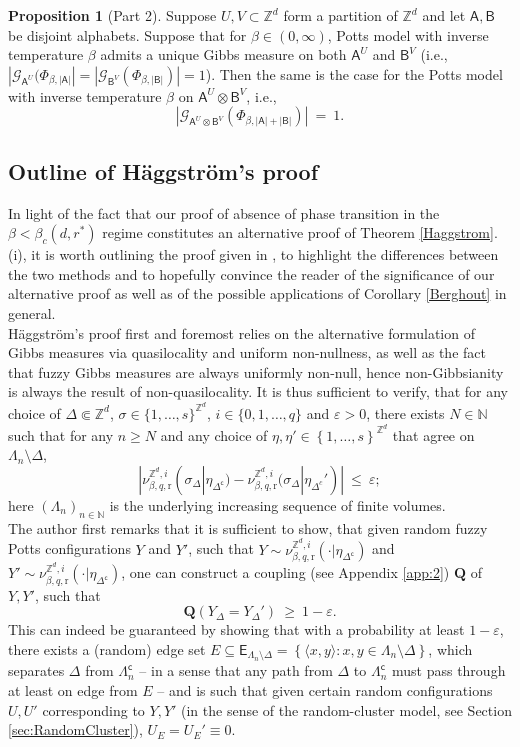 \documentclass[12pt]{article}
\renewcommand{\AA}{\mathsf{A}}
\newcommand{\AB}{\mathsf{B}}
\newcommand{\E}{\mathsf{E}}
\newcommand{\G}{\mathcal{G}}
\newcommand{\N}{\mathbb{N}}
\newcommand{\Q}{\mathbf{Q}}
\renewcommand{\r}{\mathrm{r}}
\newcommand{\Z}{\mathbb{Z}}
\newcommand{\set}[1]{\left\{#1\right\}}
\newcommand{\pika}{\boldsymbol{\cdot}}
\newcommand{\1}{\mathbbm{1}}
\renewcommand{\sp}[1]{\langle #1\rangle}
\renewcommand{\c}{\mathsf{c}}
\newcommand{\5}{\vspace{0.5cm}}
\theoremstyle{definition}
\newtheorem{prop}[thm]{Proposition}
\begin{document}
\begin{prop}[Part 2]\label{FP:part2}
Suppose $U,V\subset\Z^d$ form a partition of $\Z^d$ and let $\AA,\AB$ be disjoint alphabets. Suppose that for $\beta\in(0,\infty)$, Potts model with inverse temperature $\beta$ admits a unique Gibbs measure on both $\AA^U$ and $\AB^V$ (i.e., $|\G_{\AA^U}(\Phi_{\beta,|\AA|}|=|\G_{\AB^V}(\Phi_{\beta,|\AB|})|=1$). Then the same is the case for the Potts model with inverse temperature $\beta$ on $\AA^U\otimes\AB^V$, i.e.,
$$|\G_{\AA^U\otimes\AB^V}(\Phi_{\beta,|\AA|+|\AB|})| ~=~ 1.$$
\end{prop}

\subsection{Outline of H\"aggstr\"om's proof}\label{ProofComparison}

In light of the fact that our proof of absence of phase transition in the $\beta<\beta_c(d,r^*)$ regime constitutes an alternative proof of Theorem \ref{Haggstrom}.(i), it is worth outlining the proof given in \cite{Hag}, to highlight the differences between the two methods and to hopefully convince the reader of the significance of our alternative proof as well as of the possible applications of Corollary \ref{Berghout} in general. \\

H\"aggstr\"om's proof first and foremost relies on the alternative formulation of Gibbs measures via quasilocality and uniform non-nullness, as well as the fact that fuzzy Gibbs measures are always uniformly non-null, hence non-Gibbsianity is always the result of non-quasilocality. It is thus sufficient to verify, that for any choice of $\Delta\Subset\Z^d$, $\sigma\in\{1,\ldots,s\}^{\Z^d}$, $i\in\{0,1,\ldots,q\}$ and $\varepsilon>0$, there exists $N\in\N$ such that for any $n\geq N$ and any choice of $\eta,\eta'\in\set{1,\ldots,s}^{\Z^d}$ that agree on $\Lambda_n\setminus\Delta$,
$$|\nu_{\beta,q,\r}^{\Z^d,i}(\sigma_{\Delta}|\eta_{\Delta^\c})-\nu_{\beta,q,\r}^{\Z^d,i}(\sigma_\Delta|\eta_{\Delta^c}')| ~\leq~ \varepsilon;$$
here $(\Lambda_n)_{n\in\N}$ is the underlying increasing sequence of finite volumes. \\

The author first remarks that it is sufficient to show, that given random fuzzy Potts configurations $Y$ and $Y'$, such that $Y\sim\nu_{\beta,q,\r}^{\Z^d,i}(\pika|\eta_{\Delta^\c})$ and $Y'\sim\nu_{\beta,q,\r}^{\Z^d,i}(\pika|\eta_{\Delta^\c})$, one can construct a coupling (see Appendix \ref{app:2}) $\Q$ of $Y,Y'$, such that
$$\Q(Y_{\Delta}=Y_{\Delta}') ~\geq~ 1-\varepsilon.$$
This can indeed be guaranteed by showing that with a probability at least $1-\varepsilon$, there exists a (random) edge set $E\subseteq\E_{\Lambda_n\setminus\Delta}=\set{\sp{x,y}:x,y\in\Lambda_n\setminus\Delta}$, which separates $\Delta$ from $\Lambda_n^\c$ -- in a sense that any path from $\Delta$ to $\Lambda_n^\c$ must pass through at least on edge from $E$ -- and is such that given certain random configurations $U,U'$ corresponding to $Y,Y'$ (in the sense of the random-cluster model, see Section \ref{sec:RandomCluster}), $U_E=U_E'\equiv 0$. \\
\end{document}
